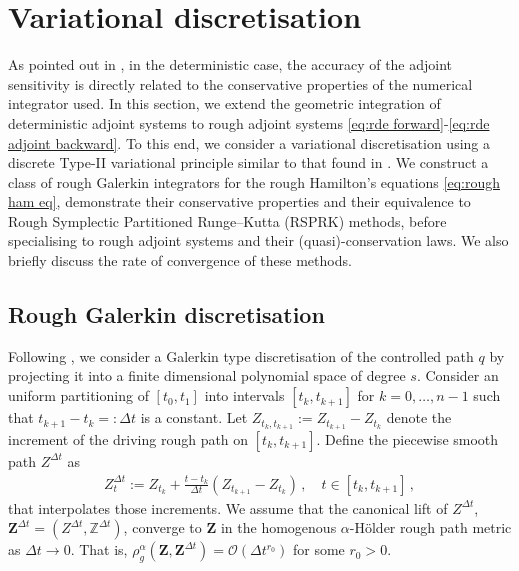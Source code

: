 \documentclass[11pt, oneside]{article}
\numberwithin{equation}{section}
\theoremstyle{definition}
\newcommand{\mc}[1]{\mathcal{#1}}
\newcommand{\mcal}[1]{\mc{#1}}
\begin{document}
\section{Variational discretisation}\label{sec:variational discretisation}
As pointed out in \cite{Sanz-Serna2016}, in the deterministic case, the accuracy of the adjoint sensitivity is directly related to the conservative properties of the numerical integrator used. In this section, we extend the geometric integration of deterministic adjoint systems to rough adjoint systems \eqref{eq:rde forward}-\eqref{eq:rde adjoint backward}. To this end, we consider a variational discretisation using a discrete Type-II variational principle similar to that found in \cite{LZ2011,HT2018,TL2024}. We construct a class of rough Galerkin integrators for the rough Hamilton's equations \eqref{eq:rough ham eq}, demonstrate their conservative properties and their equivalence to Rough Symplectic Partitioned Runge--Kutta (RSPRK) methods, before specialising to rough adjoint systems and their (quasi)-conservation laws. We also briefly discuss the rate of convergence of these methods.

\subsection{Rough Galerkin discretisation}\label{subsec:rough galerkin}
Following \cite{LZ2011, HT2018}, we consider a Galerkin type discretisation of the controlled path $q$ by projecting it into a finite dimensional polynomial space of degree $s$. Consider an uniform partitioning of $[t_0, t_1]$ into intervals $[t_k, t_{k+1}]$ for $k=0, \ldots, n-1$ such that $t_{k+1} - t_k =: \Delta t$ is a constant. Let $Z_{t_k, t_{k+1}} := Z_{t_{k+1}} - Z_{t_k}$ denote the increment of the driving rough path on $[t_k, t_{k+1}]$. Define the piecewise smooth path $Z^{\Delta t}$ as
\begin{align}
    Z^{\Delta t}_t := Z_{t_k} + \frac{t-t_k}{\Delta t}\left(Z_{t_{k+1}} - Z_{t_k}\right)\,,\quad t \in[t_k, t_{k+1}]\,, \label{eq:piecewise smooth path}
\end{align}
that interpolates those increments. We assume that the canonical lift of $Z^{\Delta t}$, $\mathbf{Z}^{\Delta t} = (Z^{\Delta t}, \mathbb{Z}^{\Delta t})$, converge to $\mathbf{Z}$ in the homogenous $\alpha$-H\"older rough path metric as $\Delta t \rightarrow 0$. That is, $\rho^\alpha_g(\mathbf{Z}, \mathbf{Z}^{\Delta t}) = \mcal{O}(\Delta t^{r_0})$ for some $r_0 > 0$. 
\end{document}
